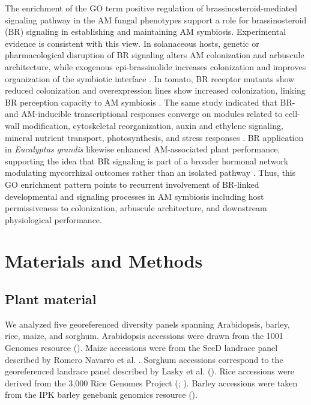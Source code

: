 \documentclass[unnumsec,webpdf,contemporary,large]{oup-authoring-template}%
\theoremstyle{thmstyleone}%
\theoremstyle{thmstyletwo}%
\theoremstyle{thmstylethree}%
\begin{document}
The enrichment of the GO term positive regulation of brassinosteroid-mediated signaling pathway in the AM fungal phenotypes support a role for brassinosteroid (BR) signaling in establishing and maintaining AM symbiosis. Experimental evidence is consistent with this view. In solanaceous hosts, genetic or pharmacological disruption of BR signaling alters AM colonization and arbuscule architecture, while exogenous epi-brassinolide increases colonization and improves organization of the symbiotic interface \citep{vonSivers2019}. In tomato, BR receptor mutants show reduced colonization and overexpression lines show increased colonization, linking BR perception capacity to AM symbiosis \citep{Ren2024BRTomato}. The same study indicated that BR- and AM-inducible transcriptional responses converge on modules related to cell-wall modification, cytoskeletal reorganization, auxin and ethylene signaling, mineral nutrient transport, photosynthesis, and stress responses \citep{Ren2024BRTomato}. BR application in \textit{Eucalyptus grandis} likewise enhanced AM-associated plant performance, supporting the idea that BR signaling is part of a broader hormonal network modulating mycorrhizal outcomes rather than an isolated pathway \citep{Ren2024BRTomato}. Thus, this GO enrichment pattern points to recurrent involvement of BR-linked developmental and signaling processes in AM symbiosis including host permissiveness to colonization, arbuscule architecture, and downstream physiological performance.




\section{Materials and Methods}

\subsection{Plant material}
We analyzed five georeferenced diversity panels spanning Arabidopsis, barley, rice, maize, and sorghum. Arabidopsis accessions were drawn from the 1001 Genomes resource (\cite{1001genomes2016}). Maize accessions were from the SeeD landrace panel described by Romero Navarro et al. \citealp{romeroNavarro2017}. Sorghum accessions correspond to the georeferenced landrace panel described by Lasky et al. (\citealp{lasky2015}). Rice accessions were derived from the 3,000 Rice Genomes Project (\citealp{rice3k2014}; \citealp{wang2018}). Barley accessions were taken from the IPK barley genebank genomics resource (\citealp{milner2019,konig2020}).
\end{document}
